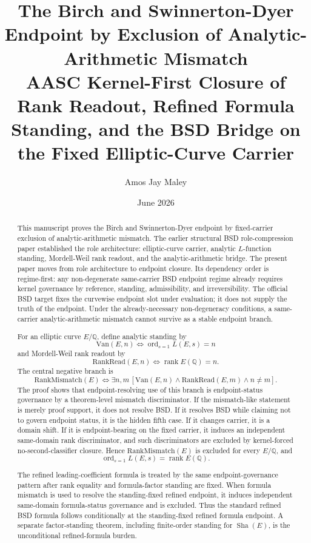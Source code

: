 \documentclass[11pt]{article}
\title{The Birch and Swinnerton-Dyer Endpoint by Exclusion of Analytic-Arithmetic Mismatch\\[3pt]
\large AASC Kernel-First Closure of Rank Readout, Refined Formula Standing, and the BSD Bridge on the Fixed Elliptic-Curve Carrier}
\author{Amos Jay Maley}
\date{June 2026}
\newcommand{\Q}{\mathbb{Q}}
\newcommand{\Sha}{\operatorname{Sha}}
\newcommand{\rank}{\operatorname{rank}}
\newcommand{\ord}{\operatorname{ord}}
\newcommand{\Van}{\mathrm{Van}}
\newcommand{\RankRead}{\mathrm{RankRead}}
\newcommand{\RankMismatch}{\mathrm{RankMismatch}}
\begin{document}
\maketitle

\begin{center}
\end{center}

\begin{abstract}
This manuscript proves the Birch and Swinnerton-Dyer endpoint by fixed-carrier exclusion of analytic-arithmetic mismatch. The earlier structural BSD role-compression paper established the role architecture: elliptic-curve carrier, analytic $L$-function standing, Mordell-Weil rank readout, and the analytic-arithmetic bridge. The present paper moves from role architecture to endpoint closure. Its dependency order is regime-first: any non-degenerate same-carrier BSD endpoint regime already requires kernel governance by reference, standing, admissibility, and irreversibility. The official BSD target fixes the curvewise endpoint slot under evaluation; it does not supply the truth of the endpoint. Under the already-necessary non-degeneracy conditions, a same-carrier analytic-arithmetic mismatch cannot survive as a stable endpoint branch.

For an elliptic curve $E/\Q$, define analytic standing by
\[
\Van(E,n) \Longleftrightarrow \ord_{s=1}L(E,s)=n
\]
and Mordell-Weil rank readout by
\[
\RankRead(E,n) \Longleftrightarrow \rank E(\Q)=n.
\]
The central negative branch is
\[
\RankMismatch(E) \Longleftrightarrow \exists n,m\,[\Van(E,n)\wedge \RankRead(E,m)\wedge n\neq m].
\]
The proof shows that endpoint-resolving use of this branch is endpoint-status governance by a theorem-level mismatch discriminator. If the mismatch-like statement is merely proof support, it does not resolve BSD. If it resolves BSD while claiming not to govern endpoint status, it is the hidden fifth case. If it changes carrier, it is a domain shift. If it is endpoint-bearing on the fixed carrier, it induces an independent same-domain rank discriminator, and such discriminators are excluded by kernel-forced no-second-classifier closure. Hence $\RankMismatch(E)$ is excluded for every $E/\Q$, and
\[
\ord_{s=1}L(E,s)=\rank E(\Q).
\]

The refined leading-coefficient formula is treated by the same endpoint-governance pattern after rank equality and formula-factor standing are fixed. When formula mismatch is used to resolve the standing-fixed refined endpoint, it induces independent same-domain formula-status governance and is excluded. Thus the standard refined BSD formula follows conditionally at the standing-fixed refined formula endpoint. A separate factor-standing theorem, including finite-order standing for $\Sha(E)$, is the unconditional refined-formula burden.
\end{abstract}
\end{document}
